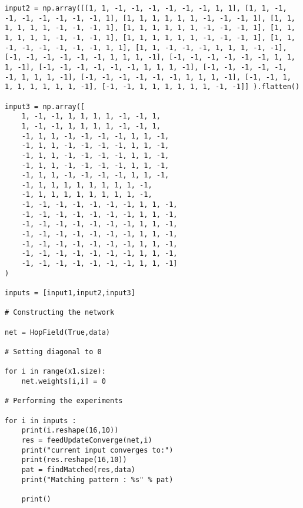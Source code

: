 \documentclass{article}
\begin{document}
\begin{verbatim}
input2 = np.array([[1, 1, -1, -1, -1, -1, -1, -1, 1, 1], [1, 1, -1, -1, -1, -1, -1, -1, -1, 1], [1, 1, 1, 1, 1, 1, -1, -1, -1, 1], [1, 1, 1, 1, 1, 1, -1, -1, -1, 1], [1, 1, 1, 1, 1, 1, -1, -1, -1, 1], [1, 1, 1, 1, 1, 1, -1, -1, -1, 1], [1, 1, 1, 1, 1, 1, -1, -1, -1, 1], [1, 1, -1, -1, -1, -1, -1, -1, 1, 1], [1, 1, -1, -1, -1, 1, 1, 1, -1, -1], [-1, -1, -1, -1, -1, -1, 1, 1, 1, -1], [-1, -1, -1, -1, -1, -1, 1, 1, 1, -1], [-1, -1, -1, -1, -1, -1, 1, 1, 1, -1], [-1, -1, -1, -1, -1, -1, 1, 1, 1, -1], [-1, -1, -1, -1, -1, -1, 1, 1, 1, -1], [-1, -1, 1, 1, 1, 1, 1, 1, 1, -1], [-1, -1, 1, 1, 1, 1, 1, 1, -1, -1]] ).flatten()

input3 = np.array([
    1, -1, -1, 1, 1, 1, 1, -1, -1, 1,
    1, -1, -1, 1, 1, 1, 1, -1, -1, 1,
    -1, 1, 1, -1, -1, -1, -1, 1, 1, -1,
    -1, 1, 1, -1, -1, -1, -1, 1, 1, -1,
    -1, 1, 1, -1, -1, -1, -1, 1, 1, -1,
    -1, 1, 1, -1, -1, -1, -1, 1, 1, -1,
    -1, 1, 1, -1, -1, -1, -1, 1, 1, -1,
    -1, 1, 1, 1, 1, 1, 1, 1, 1, -1,
    -1, 1, 1, 1, 1, 1, 1, 1, 1, -1,
    -1, -1, -1, -1, -1, -1, -1, 1, 1, -1,
    -1, -1, -1, -1, -1, -1, -1, 1, 1, -1,
    -1, -1, -1, -1, -1, -1, -1, 1, 1, -1,
    -1, -1, -1, -1, -1, -1, -1, 1, 1, -1,
    -1, -1, -1, -1, -1, -1, -1, 1, 1, -1,
    -1, -1, -1, -1, -1, -1, -1, 1, 1, -1,
    -1, -1, -1, -1, -1, -1, -1, 1, 1, -1]
)

inputs = [input1,input2,input3]

# Constructing the network

net = HopField(True,data)

# Setting diagonal to 0

for i in range(x1.size):
    net.weights[i,i] = 0

# Performing the experiments

for i in inputs :
    print(i.reshape(16,10))
    res = feedUpdateConverge(net,i)
    print("current input converges to:")
    print(res.reshape(16,10))
    pat = findMatched(res,data)
    print("Matching pattern : %s" % pat)

    print()

\end{verbatim}
\end{document}
